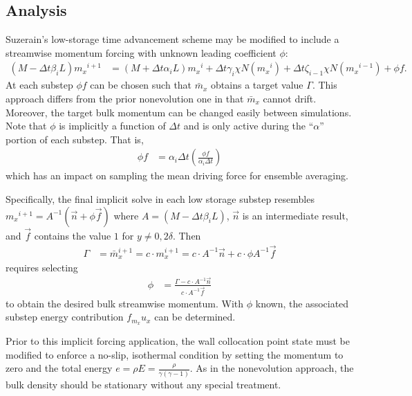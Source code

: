 \documentclass[letterpaper,11pt,nointlimits,reqno]{amsart}
\begin{document}
\subsection{Analysis}

Suzerain's low-storage time advancement scheme may be modified to include a
streamwise momentum forcing with unknown leading coefficient $\phi$:
\begin{align}
  \left(M - \Delta{}t\beta_{i}L\right) {m_x}^{i+1}
  &=
  \left(M + \Delta{}t\alpha_{i}L\right) {m_x}^{i}
  + \Delta{}t\gamma_{i}\chi{}N\left({m_x}^{i}\right)
  + \Delta{}t\zeta_{i-1}\chi{}N\left({m_x}^{i-1}\right)
  + \phi{} f
  .
\end{align}
At each substep $\phi{} f$ can be chosen such that $\bar{m}_x$ obtains a target
value $\Gamma$.  This approach differs from the prior nonevolution one in that
$\bar{m}_x$ cannot drift.  Moreover, the target bulk momentum can be changed
easily between simulations.  Note that $\phi$ is implicitly a function of
$\Delta{}t$ and is only active during the ``$\alpha$'' portion of each substep.
That is,
\begin{align} %
  \phi{} f &= \alpha_i \Delta{}t \left(\frac{\phi{}f}{\alpha_i\Delta{}t}\right)
\end{align}
which has an impact on sampling the mean driving force for ensemble
averaging.

Specifically, the final implicit solve in each low storage substep resembles
${m_x}^{i+1} = A^{-1}\left(\vec{n} + \phi\vec{f}\right)$ where $A = \left(M -
\Delta{}t\beta_{i}L\right)$, $\vec{n}$ is an intermediate result, and $\vec{f}$
contains the value $1$ for $y\neq{}0,2\delta$.  Then
\begin{align}
\Gamma &= \bar{m}_x^{i+1}
        = c \cdot m_x^{i+1}
        = c \cdot{} A^{-1}\vec{n} + c \cdot{} \phi{}A^{-1}\vec{f}
\end{align}
requires selecting
\begin{align}
  \phi &= \frac{\Gamma - c \cdot{} A^{-1} \vec{n}}{c \cdot{} A^{-1} \vec{f}}
  \label{eq:phitarget}
\end{align}
to obtain the desired bulk streamwise momentum.  With $\phi$ known, the
associated substep energy contribution $f_{m_x} u_{x}$ can be determined.

Prior to this implicit forcing application, the wall collocation point state
must be modified to enforce a no-slip, isothermal condition by setting the
momentum to zero and the total energy $e = \rho {E} =
\frac{\rho}{\gamma\left(\gamma-1\right)}$.  As in the nonevolution approach,
the bulk density should be stationary without any special treatment.
\end{document}
